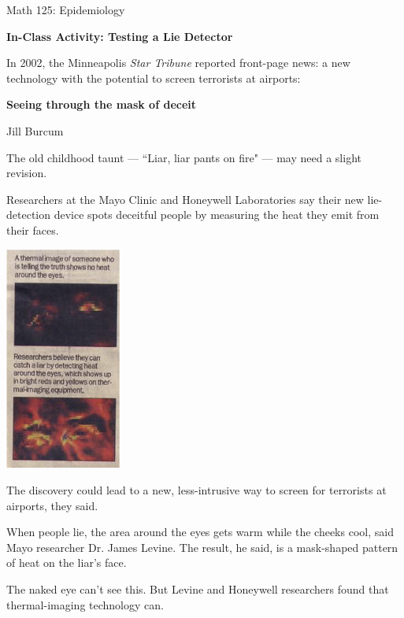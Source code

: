 \documentclass{article}
\begin{document}
\pagestyle{empty}
\centerline{\Large \sffamily Math 125: Epidemiology}

\bigskip

\centerline{\Large \sffamily \bfseries In-Class Activity: Testing a Lie Detector}

\vspace*{.25in}

\noindent In 2002, the Minneapolis {\em Star Tribune} reported front-page news: a new technology with the potential to screen terrorists at airports:

\bigskip

\centerline{\Large \bf Seeing through the mask of deceit}

\begin{multicols}{2}
\noindent Jill Burcum


\bigskip

The old childhood taunt --- ``Liar, liar pants on fire" --- may need a slight revision.

Researchers at the Mayo Clinic and Honeywell Laboratories say their new lie-detection device spots deceitful people by measuring the heat they emit from their faces.

\centerline{\includegraphics[width=1.5in]{thermal-image.png}}

The discovery could lead to a new, less-intrusive way to screen for terrorists at airports, they said.

When people lie, the area around the eyes gets warm while the cheeks cool, said Mayo researcher Dr. James Levine. The result, he said, is a mask-shaped pattern of heat on the liar's face.

The naked eye can't see this. But Levine and Honeywell researchers found that thermal-imaging technology can.


\end{multicols}
\end{document}
